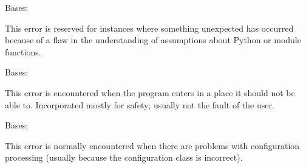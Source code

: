 \documentclass[letterpaper,10pt,english]{sphinxmanual}
\begin{document}
\begin{fulllineitems}
\label{\detokenize{docstrings/ifa_smeargle.core.error:ifa_smeargle.core.error.AssumptionError}}
Bases: {\hyperref[\detokenize{docstrings/ifa_smeargle.core.error:ifa_smeargle.core.error.Ifas_BaseException}]{}}

This error is reserved for instances where something
unexpected has occurred because of a flaw in the understanding
of assumptions about Python or module functions.

\end{fulllineitems}


\begin{fulllineitems}
\label{\detokenize{docstrings/ifa_smeargle.core.error:ifa_smeargle.core.error.BrokenLogicError}}
Bases: {\hyperref[\detokenize{docstrings/ifa_smeargle.core.error:ifa_smeargle.core.error.Ifas_BaseException}]{}}

This error is encountered when the program enters in a place it
should not be able to. Incorporated mostly for safety; usually
not the fault of the user.

\end{fulllineitems}


\begin{fulllineitems}
\label{\detokenize{docstrings/ifa_smeargle.core.error:ifa_smeargle.core.error.ConfigurationError}}
Bases: {\hyperref[\detokenize{docstrings/ifa_smeargle.core.error:ifa_smeargle.core.error.Ifas_Exception}]{}}

This error is normally encountered when there are problems with
configuration processing (usually because the configuration
class is incorrect).

\end{fulllineitems}
\end{document}
